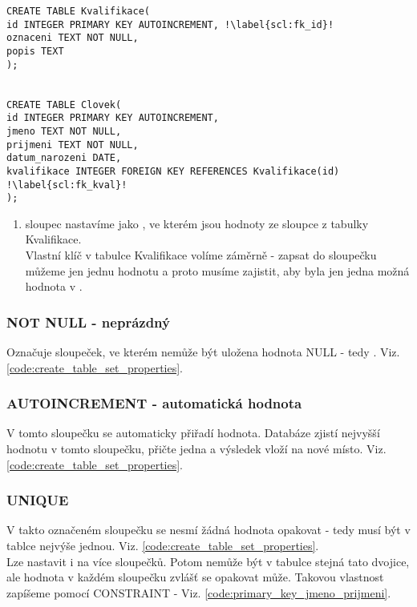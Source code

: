 \begin{minipage}[t]{.45\textwidth}
\begin{code}
\begin{verbatim}
CREATE TABLE Kvalifikace(
id INTEGER PRIMARY KEY AUTOINCREMENT, !\label{scl:fk_id}!
oznaceni TEXT NOT NULL,
popis TEXT
);


CREATE TABLE Clovek( 
id INTEGER PRIMARY KEY AUTOINCREMENT, 
jmeno TEXT NOT NULL,
prijmeni TEXT NOT NULL,
datum_narozeni DATE,
kvalifikace INTEGER FOREIGN KEY REFERENCES Kvalifikace(id) !\label{scl:fk_kval}!
);
\end{verbatim}
\label{code:foreign_key}
\end{code}
\end{minipage}
\begin{minipage}[t]{.45\textwidth}
\begin{enumerate}
\item[ř. \ref{scl:fk_kval}:] sloupec  nastavíme jako , ve kterém jsou hodnoty ze sloupce  z tabulky Kvalifikace.\\Vlastní klíč  v tabulce Kvalifikace volíme záměrně - zapsat do sloupečku  můžeme jen jednu hodnotu a proto musíme zajistit, aby byla jen jedna možná hodnota v .
\end{enumerate} 
\end{minipage}

\subsubsection{NOT NULL - neprázdný}
Označuje sloupeček, ve kterém nemůže být uložena hodnota NULL - tedy . Viz. \ref{code:create_table_set_properties}.

\subsubsection{AUTOINCREMENT - automatická hodnota}
V tomto sloupečku se automaticky přiřadí hodnota. Databáze zjistí nejvyšší hodnotu v tomto sloupečku, přičte jedna a výsledek vloží na nové místo. Viz. \ref{code:create_table_set_properties}.

\subsubsection{UNIQUE}
V takto označeném sloupečku se nesmí žádná hodnota opakovat - tedy musí být v tablce nejvýše jednou. Viz. \ref{code:create_table_set_properties}.\\
Lze nastavit i na více sloupečků. Potom nemůže být v tabulce stejná tato dvojice, ale hodnota v každém sloupečku zvlášť se opakovat může. Takovou vlastnost zapíšeme pomocí CONSTRAINT - Viz. \ref{code:primary_key_jmeno_prijmeni}.

